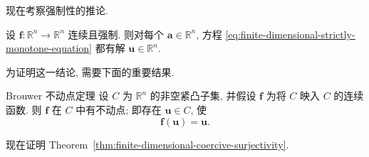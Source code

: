 现在考察强制性的推论.

\begin{Theorem}
\label{thm:finite-dimensional-coercive-surjectivity}
设 $\bm{f}:\mathbb{R}^n\to\mathbb{R}^n$ 连续且强制. 则对每个 $\bm{a}\in\mathbb{R}^n$, 方程 \eqref{eq:finite-dimensional-strictly-monotone-equation} 都有解 $\bm{u}\in\mathbb{R}^n$.
\end{Theorem}

为证明这一结论, 需要下面的重要结果.

\begin{Theorem}{Brouwer 不动点定理}
\label{thm:brouwer-fixed-point}
设 $C$ 为 $\mathbb{R}^n$ 的非空紧凸子集, 并假设 $\bm{f}$ 为将 $C$ 映入 $C$ 的连续函数. 则 $\bm{f}$ 在 $C$ 中有不动点; 即存在 $\bm{u}\in C$, 使
\begin{equation}\label{eq:brouwer-fixed-point-equation}
\bm{f}(\bm{u})=\bm{u}.
\end{equation}

\end{Theorem}

\begingroup
\renewcommand{\endProof}{\par\nobreak\hfill$\blacksquare$\par\vspace{0.1cm}}
\endgroup

现在证明 Theorem~\ref{thm:finite-dimensional-coercive-surjectivity}.

